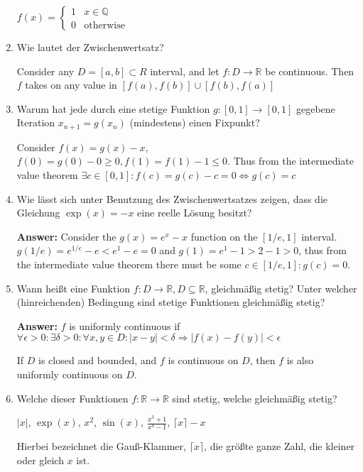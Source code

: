 \documentclass[11pt]{article}
\begin{document}
\begin{enumerate}
$f(x) = \begin{cases}
    1&x\in \mathbb{Q}\\
    0&\text{otherwise}
\end{cases}$

\item Wie lautet der Zwischenwertsatz?

Consider any $D = [a, b] \subset R$ interval, and let $f\colon D \to \mathbb{R}$ be continuous. Then $f$ takes on any value in $[f(a), f(b)] \cup [f(b), f(a)]$

\item Warum hat jede durch eine stetige Funktion $g\colon [0,1] \to [0,1]$ gegebene Iteration $x_{n+1} = g(x_n)$ (mindestens) einen Fixpunkt?

Consider $f(x) = g(x) - x$, $f(0) = g(0) - 0 \ge 0, f(1) = f(1) - 1 \le 0$. Thus from the intermediate value theorem $\exists c\in[0, 1]\colon f(c) = g(c) - c = 0 \Leftrightarrow g(c) = c$



\item Wie lässt sich unter Benutzung des Zwischenwertsatzes zeigen, dass die Gleichung $\exp(x) = -x$ eine reelle Lösung besitzt?

\textbf{Answer:} Consider the $g(x) = e^x - x$ function on the $[1/e, 1]$ interval. $g(1/e) = e^{1/e} - e < e^1 - e = 0$ and $g(1) = e^1 - 1 > 2 - 1 > 0$, thus from the intermediate value theorem there must be some $c \in [1/e, 1]\colon g(c) = 0$.

\item Wann heißt eine Funktion $f\colon D \to \mathbb{R}, D \subseteq \mathbb{R}$, gleichmäßig stetig? Unter welcher (hinreichenden) Bedingung sind stetige Funktionen gleichmäßig stetig?

\textbf{Answer:} $f$ is uniformly continuous if $\forall \epsilon > 0\colon \exists \delta > 0\colon \forall x, y \in D\colon | x - y| < \delta \Rightarrow |f(x) - f(y) | < \epsilon$

If $D$ is closed and bounded, and $f$ is continuous on $D$, then $f$ is also uniformly continuous on $D$.

\item  Welche dieser Funktionen $f\colon \mathbb{R} \to \mathbb{R}$ sind stetig, welche gleichmäßig stetig?
 \begin{center}
    $|x|$,   $\operatorname{exp}(x)$, $x^2$, $\sin(x)$, $\frac{x^3+1}{x^4-1}$, $\lceil x \rceil - x$
\end{center}
Hierbei bezeichnet die Gauß-Klammer, $\lceil x \rceil$, die größte ganze Zahl, die kleiner oder gleich $x$ ist.


\end{enumerate}
\end{document}
